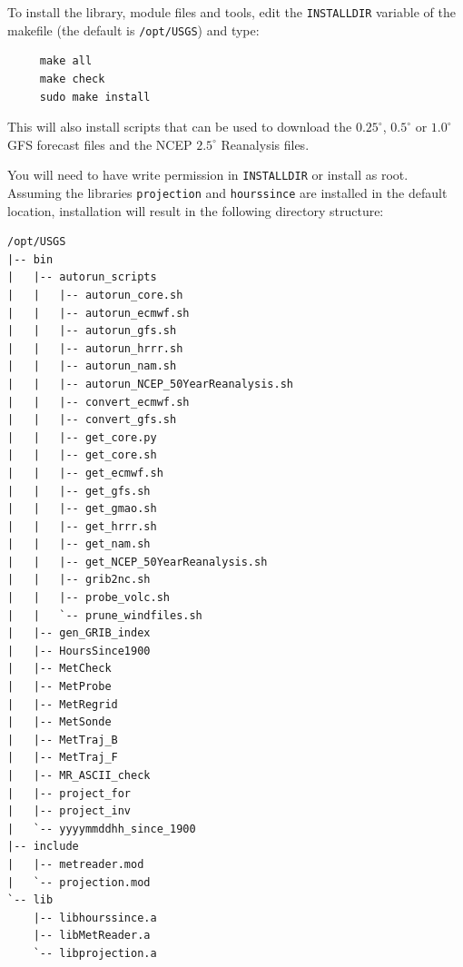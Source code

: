\documentclass[11pt]{article}   %
\begin{document}
To install the library, module files and tools, edit the \texttt{INSTALLDIR} variable of
the makefile (the default is \texttt{/opt/USGS}) and type:
\begin{verbatim}
     make all
     make check
     sudo make install
\end{verbatim}
This will also install scripts that can be used to download the $0.25^{\circ}$, $0.5^{\circ}$ or $1.0^{\circ}$ GFS
forecast files and the NCEP $2.5^{\circ}$ Reanalysis files.

You will need to have write permission in \texttt{INSTALLDIR}
or install as root.  Assuming the libraries \texttt{projection} and \texttt{hourssince} are
installed in the default location, installation will result in the following
directory structure:
\begin{verbatim}
/opt/USGS
|-- bin
|   |-- autorun_scripts
|   |   |-- autorun_core.sh
|   |   |-- autorun_ecmwf.sh
|   |   |-- autorun_gfs.sh
|   |   |-- autorun_hrrr.sh
|   |   |-- autorun_nam.sh
|   |   |-- autorun_NCEP_50YearReanalysis.sh
|   |   |-- convert_ecmwf.sh
|   |   |-- convert_gfs.sh
|   |   |-- get_core.py
|   |   |-- get_core.sh
|   |   |-- get_ecmwf.sh
|   |   |-- get_gfs.sh
|   |   |-- get_gmao.sh
|   |   |-- get_hrrr.sh
|   |   |-- get_nam.sh
|   |   |-- get_NCEP_50YearReanalysis.sh
|   |   |-- grib2nc.sh
|   |   |-- probe_volc.sh
|   |   `-- prune_windfiles.sh
|   |-- gen_GRIB_index
|   |-- HoursSince1900
|   |-- MetCheck
|   |-- MetProbe
|   |-- MetRegrid
|   |-- MetSonde
|   |-- MetTraj_B
|   |-- MetTraj_F
|   |-- MR_ASCII_check
|   |-- project_for
|   |-- project_inv
|   `-- yyyymmddhh_since_1900
|-- include
|   |-- metreader.mod
|   `-- projection.mod
`-- lib
    |-- libhourssince.a
    |-- libMetReader.a
    `-- libprojection.a
\end{verbatim}
\end{document}
